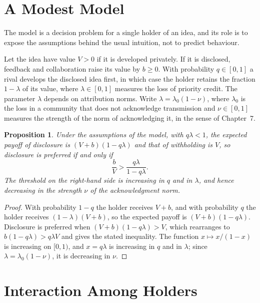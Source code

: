 \documentclass[11pt]{book}
\newtheorem{proposition}[theorem]{Proposition}
\theoremstyle{definition}
\theoremstyle{remark}
\begin{document}
\section{A Modest Model}

The model is a decision problem for a single holder of an idea, and its role is to expose the assumptions behind the usual intuition, not to predict behaviour.

Let the idea have value $V>0$ if it is developed privately. If it is disclosed, feedback and collaboration raise its value by $b\ge0$. With probability $q\in[0,1]$ a rival develops the disclosed idea first, in which case the holder retains the fraction $1-\lambda$ of its value, where $\lambda\in[0,1]$ measures the loss of priority credit. The parameter $\lambda$ depends on attribution norms. Write $\lambda=\lambda_0(1-\nu)$, where $\lambda_0$ is the loss in a community that does not acknowledge transmission and $\nu\in[0,1]$ measures the strength of the norm of acknowledging it, in the sense of Chapter~7.

\begin{proposition}\label{prop:disclose}
Under the assumptions of the model, with $q\lambda<1$, the expected payoff of disclosure is $(V+b)(1-q\lambda)$ and that of withholding is $V$, so disclosure is preferred if and only if
\[
\frac{b}{V}>\frac{q\lambda}{1-q\lambda}.
\]
The threshold on the right-hand side is increasing in $q$ and in $\lambda$, and hence decreasing in the strength $\nu$ of the acknowledgment norm.
\end{proposition}

\begin{proof}
With probability $1-q$ the holder receives $V+b$, and with probability $q$ the holder receives $(1-\lambda)(V+b)$, so the expected payoff is $(V+b)(1-q\lambda)$. Disclosure is preferred when $(V+b)(1-q\lambda)>V$, which rearranges to $b(1-q\lambda)>q\lambda V$ and gives the stated inequality. The function $x\mapsto x/(1-x)$ is increasing on $[0,1)$, and $x=q\lambda$ is increasing in $q$ and in $\lambda$; since $\lambda=\lambda_0(1-\nu)$, it is decreasing in $\nu$.
\end{proof}

\section{Interaction Among Holders}
\end{document}
